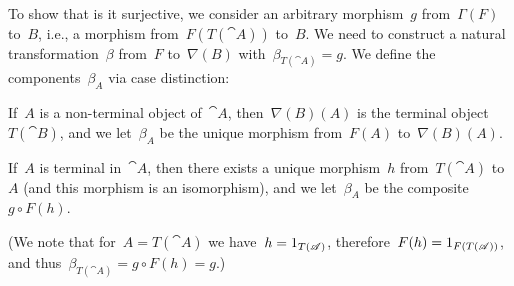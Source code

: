 To show that is it surjective, we consider an arbitrary morphism~$g$ from~$Γ(F)$ to~$B$, i.e., a morphism from~$F(T(\cat{A}))$ to~$B$.
We need to construct a natural transformation~$β$ from~$F$ to~$∇(B)$ with~$β_{T(\cat{A})} = g$.
We define the components~$β_A$ via case distinction:
\begin{casedistinction}

	\item
		If~$A$ is a non-terminal object of~$\cat{A}$, then~$∇(B)(A)$ is the terminal object~$T(\cat{B})$, and we let~$β_A$ be the unique morphism from~$F(A)$ to~$∇(B)(A)$.

	\item
		If~$A$ is terminal in~$\cat{A}$, then there exists a unique morphism~$h$ from~$T(\cat{A})$ to~$A$ (and this morphism is an isomorphism), and we let~$β_A$ be the composite~$g ∘ F(h)$.

		(We note that for~$A = T(\cat{A})$ we have~$h = 1_{T(\mathscr{A})}$, therefore~$F(h) = 1_{F(T(\mathscr{A}))}$, and thus~$β_{T(\cat{A})} = g ∘ F(h) = g$.)
\end{casedistinction}

